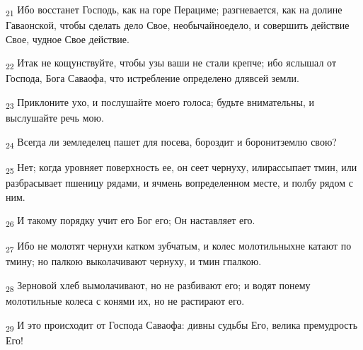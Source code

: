 \begin{tcolorbox}
\textsubscript{21} Ибо восстанет Господь, как на горе Перациме; разгневается, как на долине Гаваонской, чтобы сделать дело Свое, необычайноедело, и совершить действие Свое, чудное Свое действие.
\end{tcolorbox}
\begin{tcolorbox}
\textsubscript{22} Итак не кощунствуйте, чтобы узы ваши не стали крепче; ибо яслышал от Господа, Бога Саваофа, что истребление определено длявсей земли.
\end{tcolorbox}
\begin{tcolorbox}
\textsubscript{23} Приклоните ухо, и послушайте моего голоса; будьте внимательны, и выслушайте речь мою.
\end{tcolorbox}
\begin{tcolorbox}
\textsubscript{24} Всегда ли земледелец пашет для посева, бороздит и боронитземлю свою?
\end{tcolorbox}
\begin{tcolorbox}
\textsubscript{25} Нет; когда уровняет поверхность ее, он сеет чернуху, илирассыпает тмин, или разбрасывает пшеницу рядами, и ячмень вопределенном месте, и полбу рядом с ним.
\end{tcolorbox}
\begin{tcolorbox}
\textsubscript{26} И такому порядку учит его Бог его; Он наставляет его.
\end{tcolorbox}
\begin{tcolorbox}
\textsubscript{27} Ибо не молотят чернухи катком зубчатым, и колес молотильныхне катают по тмину; но палкою выколачивают чернуху, и тмин гпалкою.
\end{tcolorbox}
\begin{tcolorbox}
\textsubscript{28} Зерновой хлеб вымолачивают, но не разбивают его; и водят понему молотильные колеса с конями их, но не растирают его.
\end{tcolorbox}
\begin{tcolorbox}
\textsubscript{29} И это происходит от Господа Саваофа: дивны судьбы Его, велика премудрость Его!
\end{tcolorbox}
